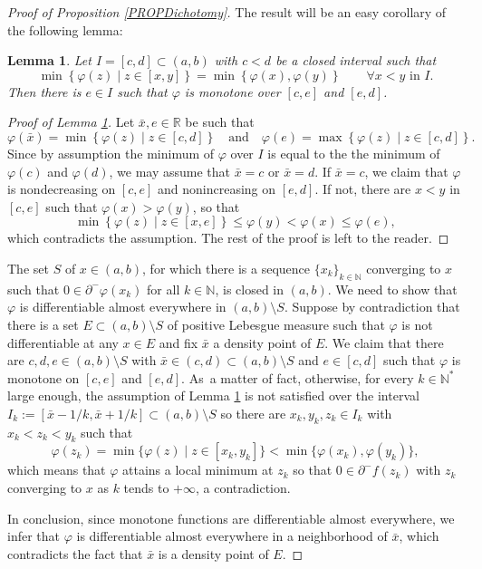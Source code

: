 \documentclass[JEP,XML,SOM,Unicode,NoFloatCountersInSection,published]{cedram}
\let\sep\mid
\newcommand\R{\mathbb R}
\newcommand\N{\mathbb N}
\newtheorem{lemma}[theorem]{Lemma}
\theoremstyle{definition}
\begin{document}
\begin{proof}[Proof of Proposition \ref{PROPDichotomy}]
The result will be an easy corollary of the following lemma:

\begin{lemma}\label{LEMDim1}
Let $I=[c,d] \subset (a,b)$ with $c<d$ be a closed interval such that
\[
\min \left\{\varphi(z) \sep  z \in [x,y]\right\} = \min \left\{\varphi(x),\varphi(y)\right\} \qquad \forall x<y \text{ in } I.
\]
Then there is $e \in I$ such that $\varphi$ is monotone over $[c,e]$ and $[e,d]$.
\end{lemma}
\begin{proof}[Proof of Lemma \ref{LEMDim1}]
Let $\bar{x},e \in \R$ be such that
\[
\varphi(\bar{x}) = \min \left\{\varphi(z) \sep  z \in [c,d]\right\} \quad \text{and} \quad \varphi(e)= \max \left\{\varphi(z) \sep  z \in [c,d]\right\}.
\]
Since by assumption the minimum of $\varphi$ over $I$ is equal to the the minimum of $\varphi(c)$ and $\varphi(d)$, we may assume that $\bar{x}=c$ or $\bar{x}=d$. If $\bar{x}=c$, we claim that $\varphi$ is nondecreasing on $[c,e]$ and nonincreasing on $[e,d]$. If not, there are $x<y$ in $[c,e]$ such that $\varphi(x)>\varphi(y)$, so that
\[
\min \left\{\varphi(z) \sep  z \in [x,e]\right\} \leq \varphi(y) < \varphi(x) \leq \varphi(e),
\]
which contradicts the assumption. The rest of the proof is left to the reader.
\end{proof}
The set $S$ of $x\in (a,b)$, for which there is a sequence $\{x_k\}_{k\in \N}$ converging to $x$ such that $0\in \partial^-\varphi(x_k)$ for all $k\in \N$, is closed in $(a,b)$. We need to show that $\varphi$ is differentiable almost everywhere in $(a,b)\setminus S$. Suppose by contradiction that there is a set $E \subset (a,b)\setminus S$ of positive Lebesgue measure such that $\varphi$ is not differentiable at any $x\in E$ and fix $\bar{x}$ a density point of $E$. We claim that there are $c, d, e \in (a,b)\setminus S$ with $\bar{x}\in (c,d) \subset (a,b)\setminus S$ and $e\in [c,d]$ such that $\varphi$ is monotone on $[c,e]$ and $[e,d]$. As~a matter of fact, otherwise, for every $k\in \N^*$ large enough, the assumption of Lemma \ref{LEMDim1} is not satisfied over the interval $I_k:=[\bar{x}-1/k,\bar{x}+1/k] \subset (a,b)\setminus S$ so there are $x_k, y_k, z_k\in I_k$ with $x_k< z_k< y_k$ such that
\[
\varphi(z_k) = \min \bigl\{\varphi(z) \sep  z \in [x_k,y_k] \bigr\} < \min \bigl\{\varphi(x_k),\varphi(y_k)\bigr\},
\]
which means that $\varphi$ attains a local minimum at $z_k$ so that $0\in \partial^-f(z_k)$ with $z_k$ converging to $x$ as $k$ tends to $+\infty$, a contradiction.

In conclusion, since monotone functions are differentiable almost everywhere, we infer that $\varphi$ is differentiable almost everywhere in a neighborhood of $\bar{x}$, which contradicts the fact that $\bar{x}$ is a density point of $E$.
\end{proof}
\end{document}
